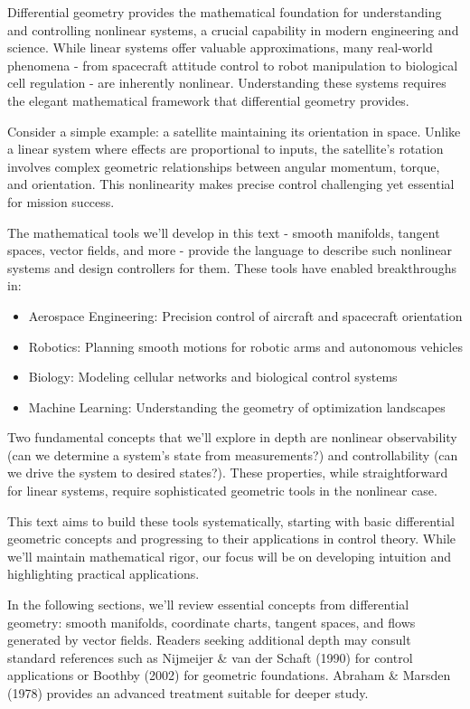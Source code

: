 
Differential geometry provides the mathematical foundation for understanding and controlling nonlinear systems, a crucial capability in modern engineering and science. While linear systems offer valuable approximations, many real-world phenomena - from spacecraft attitude control to robot manipulation to biological cell regulation - are inherently nonlinear. Understanding these systems requires the elegant mathematical framework that differential geometry provides.

Consider a simple example: a satellite maintaining its orientation in space. Unlike a linear system where effects are proportional to inputs, the satellite's rotation involves complex geometric relationships between angular momentum, torque, and orientation. This nonlinearity makes precise control challenging yet essential for mission success.

The mathematical tools we'll develop in this text - smooth manifolds, tangent spaces, vector fields, and more - provide the language to describe such nonlinear systems and design controllers for them. These tools have enabled breakthroughs in:

\begin{itemize}
\item Aerospace Engineering: Precision control of aircraft and spacecraft orientation
\item Robotics: Planning smooth motions for robotic arms and autonomous vehicles
\item Biology: Modeling cellular networks and biological control systems
\item Machine Learning: Understanding the geometry of optimization landscapes
\end{itemize}

Two fundamental concepts that we'll explore in depth are nonlinear observability (can we determine a system's state from measurements?) and controllability (can we drive the system to desired states?). These properties, while straightforward for linear systems, require sophisticated geometric tools in the nonlinear case.

This text aims to build these tools systematically, starting with basic differential geometric concepts and progressing to their applications in control theory. While we'll maintain mathematical rigor, our focus will be on developing intuition and highlighting practical applications.

In the following sections, we'll review essential concepts from differential geometry: smooth manifolds, coordinate charts, tangent spaces, and flows generated by vector fields. Readers seeking additional depth may consult standard references such as Nijmeijer \& van der Schaft (1990) for control applications or Boothby (2002) for geometric foundations. Abraham \& Marsden (1978) provides an advanced treatment suitable for deeper study.


